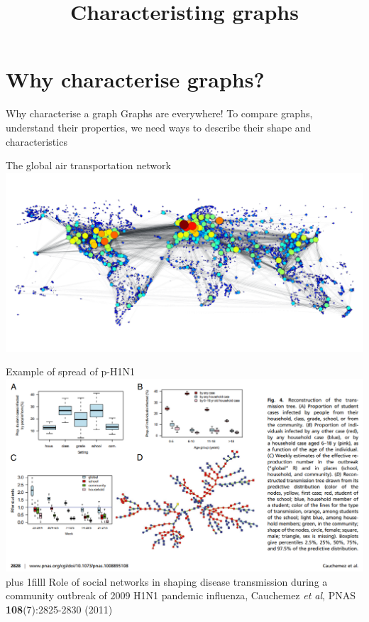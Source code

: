 \documentclass[aspectratio=43]{beamer}
\title{Characteristing graphs}
\date{}
\begin{document}
\begin{frame}
	\titlepage
\end{frame}


\section{Why characterise graphs?}
\begin{frame}{Why characterise a graph}
Graphs are everywhere!
\vfill
To compare graphs, understand their properties, we need ways to describe their shape and characteristics
\end{frame}

\begin{frame}{The global air transportation network}
	\bigskip
	{\centering
		\hspace*{-\beamerleftmargin}
		\includegraphics[width=\paperwidth]{FIGS_slides/world_graph-degree}
	}
\end{frame}

\begin{frame}{Example of spread of p-H1N1}
	\bigskip
	{\centering
		\hspace*{-\beamerleftmargin}
		\includegraphics[width=\paperwidth]{FIGS_slides/Cauchemez_etal_H1N1}
	}
	\vskip0pt plus 1filll
	\tiny
	Role of social networks in shaping disease transmission during a community outbreak of 2009 H1N1 pandemic influenza, Cauchemez \emph{et al}, PNAS \textbf{108}(7):2825-2830 (2011)
\end{frame}
\end{document}
